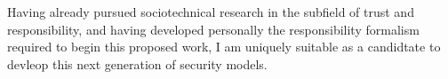 \documentclass{tufte-handout}
\begin{document}
Having already pursued sociotechnical research in the subfield of trust and responsibility, and having developed personally the responsibility formalism required to begin this proposed work, I am uniquely suitable as a candidtate to devleop this next generation of security models. 


\end{document}
